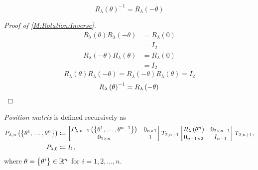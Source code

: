 \documentclass[../methodology.tex]{subfiles}
\begin{document}
\begin{corollary}\label{M:Rotation:Inverse}
    \[
        R_\lambda\left(\theta\right)^{-1}=R_\lambda\left(-\theta\right)
    \]
\end{corollary}
\begin{proof}[Proof of \cref{M:Rotation:Inverse}]
    \begin{align*}
        R_\lambda\left(\theta\right)
        R_\lambda\left(-\theta\right)
         & =R_\lambda\left(0\right) \\
         & =I_2                     \\
        R_\lambda\left(-\theta\right)
        R_\lambda\left(\theta\right)
         & =R_\lambda\left(0\right) \\
         & =I_2
    \end{align*}
    \[
        R_\lambda\left(\theta\right)R_\lambda\left(-\theta\right)
        =R_\lambda\left(-\theta\right)R_\lambda\left(\theta\right)
        =I_2
    \]
    \[
        {R_\lambda\left(\theta\right)}^{-1}
        =
        R_\lambda\left(-\theta\right)
        \qedhere
    \]
\end{proof}
\begin{definition}\label{M:Position}
    \textit{Position matrix} is defined recursively as
    \begin{align*}
        P_{\lambda,n}\left(\left\{\tensor{\theta}{^1},\dots,\tensor{\theta}{^n}\right\}\right)
                      & \coloneqq
        \begin{bmatrix}
            P_{\lambda,n-1}\left(\left\{\tensor{\theta}{^1},\dots,\tensor{\theta}{^{n-1}}\right\}\right) & 0_{n\times 1} \\
            0_{1\times n}                                                                                & 1             \\
        \end{bmatrix}
        T_{2,n+1}
        \begin{bmatrix}
            R_\lambda\left(\tensor{\theta}{^n}\right) & 0_{{2}\times{n-1}} \\
            0_{{n-1}\times{2}}                        & {I}_{n-1}          \\
        \end{bmatrix}
        T_{2,n+1}\text{,}                     \\
        P_{\lambda,0} & \coloneqq I_1\text{,}
    \end{align*}
    where \(\theta=\left\{\tensor{\theta}{^i}\right\}\in\mathbb{R}^n\) for \(i = 1, 2, \dots, n\).
\end{definition}
\end{document}
